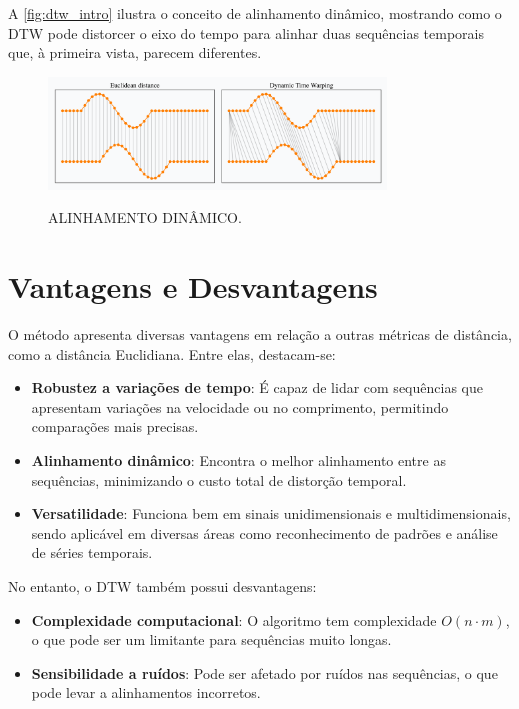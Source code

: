 A \autoref{fig:dtw_intro} ilustra o conceito de alinhamento dinâmico, mostrando como o DTW pode distorcer o eixo do tempo para alinhar duas sequências temporais que, à primeira vista, parecem diferentes.

\begin{figure}[h!]
    \centering
    \caption{ALINHAMENTO DINÂMICO.}
    \includegraphics[width=0.8\textwidth]{fig/dtw_vs_euc.png}
    \label{fig:dtw_intro}
\end{figure}

\section{Vantagens e Desvantagens}

O método apresenta diversas vantagens em relação a outras métricas de distância, como a distância Euclidiana. Entre elas, destacam-se:
\begin{itemize}
    \item \textbf{Robustez a variações de tempo}: É capaz de lidar com sequências que apresentam variações na velocidade ou no comprimento, permitindo comparações mais precisas.
    \item \textbf{Alinhamento dinâmico}: Encontra o melhor alinhamento entre as sequências, minimizando o custo total de distorção temporal.
    \item \textbf{Versatilidade}: Funciona bem em sinais unidimensionais e multidimensionais, sendo aplicável em diversas áreas como reconhecimento de padrões e análise de séries temporais.
\end{itemize}

No entanto, o DTW também possui desvantagens:
\begin{itemize}
    \item \textbf{Complexidade computacional}: O algoritmo tem complexidade \(O(n \cdot m)\), o que pode ser um limitante para sequências muito longas.
    \item \textbf{Sensibilidade a ruídos}: Pode ser afetado por ruídos nas sequências, o que pode levar a alinhamentos incorretos.
\end{itemize}


